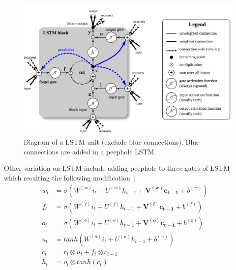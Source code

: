 \begin{figure}[H]
    \centering
    \includegraphics[scale=0.4]{figure/lstm}
    \caption{Diagram of a LSTM unit (exclude blue connections). Blue connections are added in a peephole LSTM.~\cite{lstm-search}}
    \label{fig:lstm}
\end{figure}


Other variation on LSTM include adding peephole to three gates of LSTM~\cite{peephole} which resulting the following modification~\cite{colah-lsmt}:
\begin{align}
    w_t &= \sigma(W^{(w)}i_t + U^{(w)}h_{t-1} + \bm{V^{(w)}c_{t-1}} + b^{(w)}) &\\ 
      f_t &= \sigma(W^{(f)}i_t + U^{(f)}h_{t-1} + \bm{V^{(f)}c_{t-1}} + b^{(f)}) &\\ 
      o_t &= \sigma(W^{(o)}i_t + U^{(o)}h_{t-1} + \bm{V^{(o)}c_{t-1}} + b^{(o)}) &\\ 
      u_t &= tanh(W^{(u)}i_t + U^{(u)}h_{t-1} + b^{(u)}) &\\ 
      c_t &= r_t \otimes u_t + f_t \otimes c_{t-1} &\\ 
      h_t &= o_t \otimes tanh(c_t) & 
\end{align} 

